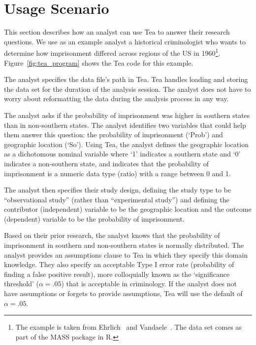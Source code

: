\section{Usage Scenario}\label{sec:usagescenario}
\figureTeaProgram

This section describes how an analyst can use Tea to answer their research
questions. We use as an example analyst a historical criminologist who wants to
determine how imprisonment differed across regions of the US in
1960\footnote{The example is taken from Ehrlich~\cite{ehrlich1973participation}
and Vandaele~\cite{vandaele1987participation}. The data set comes as part of the
MASS package in R.}. Figure~\ref{fig:tea_program} shows the Tea code for this
example.

The analyst specifies the data file's path in Tea. Tea handles loading and
storing the data set for the duration of the analysis session. The analyst does
not have to worry about reformatting the data during the analysis process in any way.

The analyst asks if the probability of imprisonment was higher in
southern states than in non-southern states. The analyst identifies
two variables that could help them answer this question: the
probability of imprisonment (`Prob') and geographic location
(`So'). %
Using Tea, the analyst defines the geographic
location as a dichotomous nominal variable where `1' indicates a
southern state and `0' indicates a non-southern state, and indicates that the
probability of imprisonment is a numeric data type (ratio) with a
range between 0 and 1. %

The analyst then specifies their study design, defining the study type
to be ``observational study'' (rather than ``experimental study'') and
defining the contributor (independent) variable to be the geographic location and
the outcome (dependent) variable to be the probability of
imprisonment.

Based on their prior research, the analyst knows that the probability
of imprisonment in southern and non-southern states is normally
distributed. The analyst provides an assumptions clause to Tea in
which they specify this domain knowledge. They also specify an
acceptable Type I error rate (probability of finding a false positive
result), more colloquially known as the `significance threshold'
($\alpha = .05$) that is acceptable in criminology. If the analyst
does not have assumptions or forgets to provide assumptions, Tea will
use the default of $\alpha = .05$.

